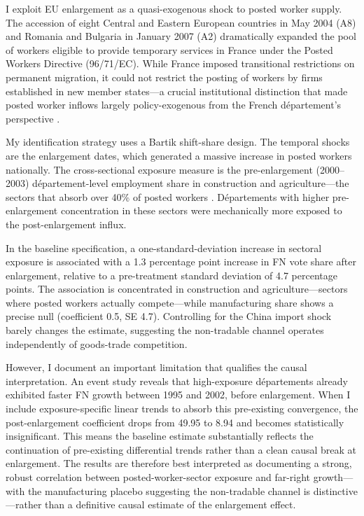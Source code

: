 \documentclass[12pt]{article}
\begin{document}
I exploit EU enlargement as a quasi-exogenous shock to posted worker supply. The accession of eight Central and Eastern European countries in May 2004 (A8) and Romania and Bulgaria in January 2007 (A2) dramatically expanded the pool of workers eligible to provide temporary services in France under the Posted Workers Directive (96/71/EC). While France imposed transitional restrictions on permanent migration, it could not restrict the posting of workers by firms established in new member states---a crucial institutional distinction that made posted worker inflows largely policy-exogenous from the French d\'epartement's perspective \citep{munoz2024posted}.

My identification strategy uses a Bartik shift-share design. The temporal shocks are the enlargement dates, which generated a massive increase in posted workers nationally. The cross-sectional exposure measure is the pre-enlargement (2000--2003) d\'epartement-level employment share in construction and agriculture---the sectors that absorb over 40\% of posted workers \citep{dares2022}. D\'epartements with higher pre-enlargement concentration in these sectors were mechanically more exposed to the post-enlargement influx.

In the baseline specification, a one-standard-deviation increase in sectoral exposure is associated with a 1.3 percentage point increase in FN vote share after enlargement, relative to a pre-treatment standard deviation of 4.7 percentage points. The association is concentrated in construction and agriculture---sectors where posted workers actually compete---while manufacturing share shows a precise null (coefficient 0.5, SE 4.7). Controlling for the China import shock barely changes the estimate, suggesting the non-tradable channel operates independently of goods-trade competition.

However, I document an important limitation that qualifies the causal interpretation. An event study reveals that high-exposure d\'epartements already exhibited faster FN growth between 1995 and 2002, before enlargement. When I include exposure-specific linear trends to absorb this pre-existing convergence, the post-enlargement coefficient drops from 49.95 to 8.94 and becomes statistically insignificant. This means the baseline estimate substantially reflects the continuation of pre-existing differential trends rather than a clean causal break at enlargement. The results are therefore best interpreted as documenting a strong, robust correlation between posted-worker-sector exposure and far-right growth---with the manufacturing placebo suggesting the non-tradable channel is distinctive---rather than a definitive causal estimate of the enlargement effect.
\end{document}
